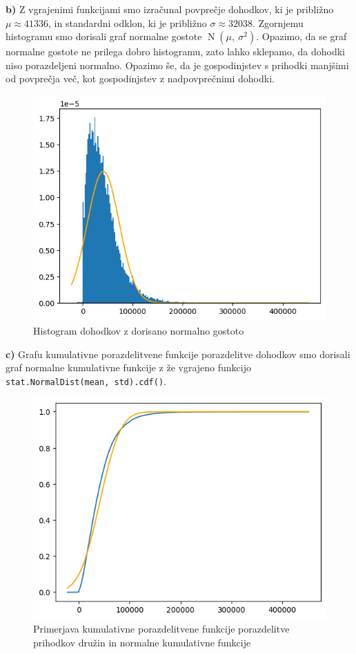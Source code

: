 \documentclass[a4paper,11pt]{article}
\DeclareMathOperator{\N}{N}
\begin{document}
\noindent
\textbf{b)} Z vgrajenimi funkcijami smo izračunal povprečje dohodkov, ki je približno $\mu \approx 41336$, in standardni odklon, ki je približno $\sigma \approx 32038$. Zgornjemu histogramu smo dorisali graf normalne gostote $\N(\mu,~\sigma^2)$. Opazimo, da se graf normalne gostote ne prilega dobro histogramu, zato lahko sklepamo, da dohodki niso porazdeljeni normalno. Opazimo še, da je gospodinjstev s prihodki manjšimi od povprečja več, kot gospodinjstev z nadpovprečnimi dohodki.
\newline 

\begin{figure}[H]
    \centering
    \includegraphics[scale = 0.5]{slike1/1_2.png}
    \caption{Histogram dohodkov z dorisano normalno gostoto}
\end{figure}


\noindent
\textbf{c)} Grafu kumulativne porazdelitvene funkcije porazdelitve dohodkov smo dorisali graf normalne kumulativne funkcije z že vgrajeno funkcijo \texttt{stat.NormalDist(mean, std).cdf()}.

\begin{figure}[H]
    \centering
    \includegraphics[scale = 0.5]{slike1/1_3.png}
    \caption{Primerjava kumulativne porazdelitvene funkcije porazdelitve prihodkov družin in normalne kumulativne funkcije}
\end{figure}
\end{document}
